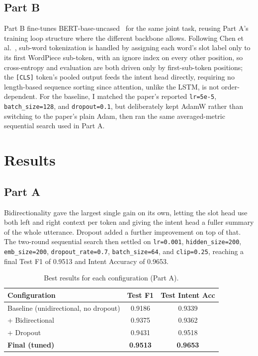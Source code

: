 \documentclass[a4paper]{article}
\begin{document}
\subsection{Part B}

Part B fine-tunes BERT-base-uncased~\cite{devlin2019bert,wolf2020transformers} for the same joint task, reusing Part A's training loop structure where the different backbone allows. Following Chen et al.~\cite{chen2019bert}, sub-word tokenization is handled by assigning each word's slot label only to its first WordPiece sub-token, with an ignore index on every other position, so cross-entropy and evaluation are both driven only by first-sub-token positions; the \texttt{[CLS]} token's pooled output feeds the intent head directly, requiring no length-based sequence sorting since attention, unlike the LSTM, is not order-dependent. For the baseline, I matched the paper's reported \texttt{lr=5e-5}, \texttt{batch\_size=128}, and \texttt{dropout=0.1}, but deliberately kept AdamW rather than switching to the paper's plain Adam, then ran the same averaged-metric sequential search used in Part A.

\section{Results}

\subsection{Part A}

Bidirectionality gave the largest single gain on its own, letting the slot head use both left and right context per token and giving the intent head a fuller summary of the whole utterance. Dropout added a further improvement on top of that. The two-round sequential search then settled on \texttt{lr=0.001}, \texttt{hidden\_size=200}, \texttt{emb\_size=200}, \texttt{dropout\_rate=0.7}, \texttt{batch\_size=64}, and \texttt{clip=0.25}, reaching a final Test F1 of 0.9513 and Intent Accuracy of 0.9653.

\begin{table}[h]
\caption{Best results for each configuration (Part A).}
\label{tab:parta}
\centering
\begin{tabular}{lcc}
\hline
\textbf{Configuration} & \textbf{Test F1} & \textbf{Test Intent Acc} \\
\hline
Baseline (unidirectional, no dropout) & 0.9186 & 0.9339 \\
+ Bidirectional                       & 0.9375 & 0.9362 \\
+ Dropout                             & 0.9431 & 0.9518 \\
\textbf{Final (tuned)}                & \textbf{0.9513} & \textbf{0.9653} \\
\hline
\end{tabular}
\end{table}
\end{document}
